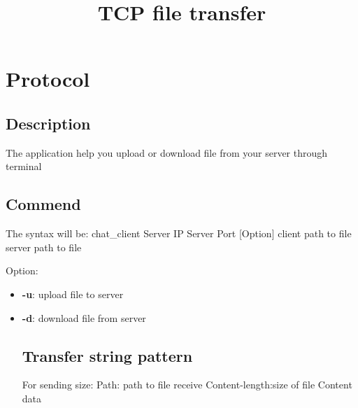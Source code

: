 \documentclass{article}
\title{TCP file transfer}
\begin{document}
\maketitle
\section{Protocol}
\subsection{Description}
The application help you upload or download file from your server through terminal
\subsection{Commend}
The syntax will be:
chat_client {Server IP} {Server Port} [Option] {client path to file} {server path to file}

Option:
\begin{itemize}
\item \textbf{-u}: upload file to server
\item \textbf{-d}: download file from server

\subsection{Transfer string pattern}
For sending size:\newline
Path: {path to file receive}
\n
Content-length:{size of file}
\n\n
{Content data}
\end{itemize}
\end{document}
